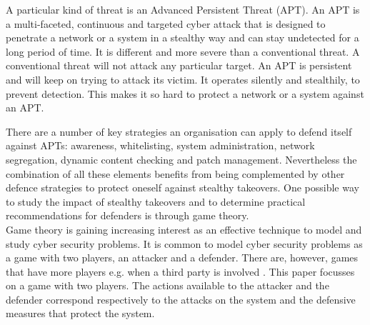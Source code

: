 A particular kind of threat is an Advanced Persistent Threat (APT). An APT is a multi-faceted, continuous and targeted cyber attack that is designed to penetrate a network or a system in a stealthy way and can stay undetected for a long period of time. It is different and more severe than a conventional threat. A conventional threat will not attack any particular target. An APT is persistent and will keep on trying to attack its victim. It operates silently and stealthily, to prevent detection. This makes it so hard to protect a network or a system against an APT. 



There are a number of key strategies an organisation can apply to defend itself against APTs: awareness, whitelisting, system administration, network segregation, dynamic content checking and patch management. Nevertheless the combination of all these elements benefits from being complemented by other defence strategies to protect oneself against stealthy takeovers. One possible way to study the impact of stealthy takeovers and to determine practical recommendations for defenders is through game theory.\\
Game theory is gaining increasing interest as an effective technique to model and study cyber security problems. It is common to model cyber security problems as a game with two players, an attacker and a defender. There are, however, games that have more players e.g. when a third party is involved \cite{fengstealthy}. This paper focusses on a game with two players. The actions available to the attacker and the defender correspond respectively to the attacks on the system and the defensive measures that protect the system. \\

